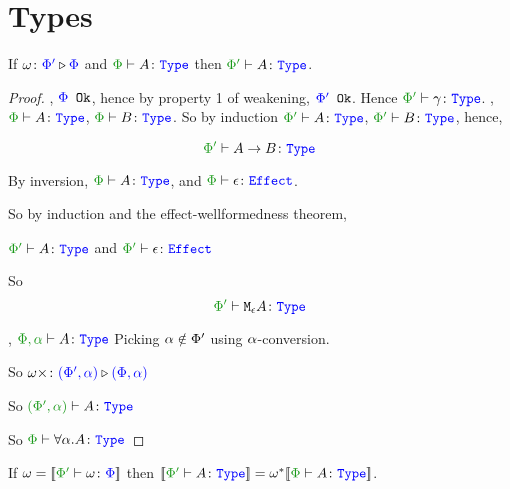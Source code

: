 \documentclass{report}
\begin{document}
\section{Types}

\begin{theorem}
        If $\omega \colon {\color{blue}\Phi'} \triangleright {\color {blue} \Phi}$ and $\wellformedt{\P}{A}$ then $\wellformedt{\P'}{A}$.
    
\end{theorem}


\begin{framed}
    \begin{proof}
            \case{\tground}
            \bi, ${\color{blue} \Phi} \texttt{ Ok}$, hence by property 1 of weakening, ${\color{blue} \Phi'} \texttt{ Ok}$. Hence $\wellformedt{\P'}{\g}$.
            \case{\tfun}
            \bi, $\wellformedt{\P}{A}$, $\wellformedt{\P}{B}$.
            So by induction $\wellformedt{\P'}{A}$, $\wellformedt{\P'}{B}$, hence,
        
            $$\wellformedt{\P'}{\ab}$$
        
            \case{\teffect}
        
            By inversion,  $\wellformedt{\P}{A}$, and $\wellformede{\P}{\e}$.
        
            So by induction and the effect-wellformedness theorem, 
        
            $\wellformedt{\P'}{A}$ and $\wellformede{\P'}{\e}$
        
            So $$\wellformedt{\P'}{\mea}$$
        
            \case{\tquant}
            \bi, $\wellformedt{\P,\a}{A}$
            Picking $\alpha\notin\Phi'$ using $\alpha$-conversion.
        
            So $\omega\times \colon {\color{blue}(\Phi', \alpha)} \triangleright {\color {blue} (\Phi, \alpha)}$
        
            So $\wellformedt{(\P', \a)}{A}$
        
            So $\wellformedt{\P}{\all{\a}{A}}$
        
        
    \end{proof}
        
\end{framed}

\begin{theorem}
    If $\w = \deno{\typerelation{\P'}{\w}{\P}}$ then $\deno{\typerelation{\P'}{A}{\type}} = \w\star\deno{\typerelation{\P}{A}{\type}}$.
\end{theorem}
\end{document}
